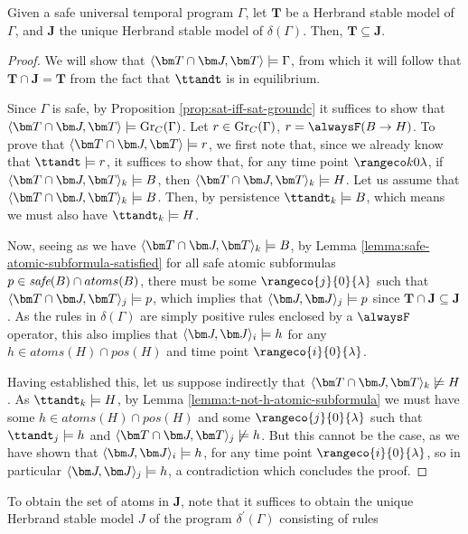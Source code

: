 \begin{proposition}\label{prop:simplified-facts}
  Given a safe universal temporal program $\Gamma$, let $\bm{T}$ be a
  Herbrand stable model of $\Gamma$, and $\bm{J}$ the unique Herbrand
  stable model of $\delta(\Gamma)$. Then, $\bm{T} \subseteq \bm{J}$.
\end{proposition}
\begin{proof} We will show that $\ttjandt \models \Gamma$, from which
  it will follow that $\bm{T} \cap \bm{J} = \bm{T}$ from the fact that
  $\ttandt$ is in equilibrium.

  Since $\Gamma$ is safe, by Proposition
  \ref{prop:sat-iff-sat-groundc} it suffices to show that
  $\ttjandt \models \ground{C}{\Gamma}$. Let $r \in \operatorname{Gr}_{C}(\Gamma)$, $r =
  \tempruleshort$. To prove that $\ttjandt \models r$, we first note
  that, since we already know that $\ttandt \models r$, it suffices to
  show that, for any time point $\kinlambda$, if
  $\ttjandt_k \models B$, then $\ttjandt_k \models H$. Let us assume
  that $\ttjandt_k \models B$. Then, by persistence
  $\ttandt_k \models B$, which means we must also have
  $\ttandt_k \models H$.

  Now, seeing as we have $\ttjandt_k \models B$, by Lemma
  \ref{lemma:safe-atomic-subformula-satisfied} for all safe atomic
  subformulas $p \in \textit{safe}(B) \cap atoms(B)$, there must be some
  $\rangeco{j}{0}{\lambda}$ such that $\ttjandt_j \models p$, which
  implies that $\tjandj_j \models p$ since
  $\bm{T} \cap \bm{J} \subseteq \bm{J}$. As the rules in
  $\delta(\Gamma)$ are simply positive rules enclosed by a $\alwaysF$
  operator, this also implies that $\tjandj_i \models h$ for any
  $h \in atoms(H) \cap pos(H)$ and time point $\rangeco{i}{0}{\lambda}$.

  Having established this, let us suppose indirectly that
  $\ttjandt_k \not\models H$. As $\ttandt_k \models H$, by Lemma
  \ref{lemma:t-not-h-atomic-subformula} we must have some
  $h \in atoms(H) \cap pos(H)$ and some $\rangeco{j}{0}{\lambda}$ such that
  $\ttandt_j \models h$ and $\ttjandt_j \not\models h$. But this
  cannot be the case, as we have shown that $\tjandj_i \models h$, for
  any time point $\rangeco{i}{0}{\lambda}$, so in particular
  $\tjandj_j \models h$, a contradiction which concludes the proof.
\end{proof}

To obtain the set of atoms in $\bm{J}$, note that it suffices to
obtain the unique Herbrand stable model $J$ of the program
$\delta^{\prime}(\Gamma)$ consisting of rules

